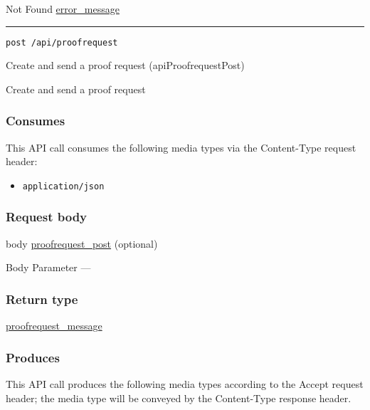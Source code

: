 Not Found \protect\hyperlink{error_message}{error\_message}

\begin{center}\rule{0.5\linewidth}{\linethickness}\end{center}

\protect\hypertarget{apiProofrequestPost}{}{}

\begin{verbatim}
post /api/proofrequest
\end{verbatim}

Create and send a proof request ({apiProofrequestPost})

Create and send a proof request

\hypertarget{consumes-53}{%
\subsubsection{Consumes}\label{consumes-53}}

This API call consumes the following media types via the {Content-Type}
request header:

\begin{itemize}
\tightlist
\item
  \texttt{application/json}
\end{itemize}

\hypertarget{request-body-53}{%
\subsubsection{Request body}\label{request-body-53}}

body \protect\hyperlink{proofrequest_post}{proofrequest\_post}
(optional)

{Body Parameter} ---

\hypertarget{return-type-131}{%
\subsubsection{Return type}\label{return-type-131}}

\protect\hyperlink{proofrequest_message}{proofrequest\_message}

\hypertarget{produces-167}{%
\subsubsection{Produces}\label{produces-167}}

This API call produces the following media types according to the
{Accept} request header; the media type will be conveyed by the
{Content-Type} response header.

